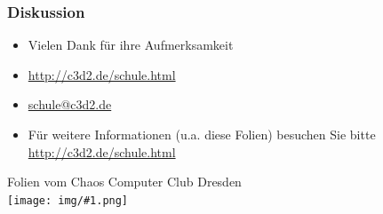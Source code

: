 \documentclass[table]{beamer}
\newcommand{\cc}[1]{\texttt{[image: img/\#1.png]}}
\begin{document}
\begin{frame}
    \frametitle{Diskussion}
    \begin{itemize}
        \item Vielen Dank für ihre Aufmerksamkeit
        \item \url{http://c3d2.de/schule.html}
        \item \url{schule@c3d2.de}
        \item Für weitere Informationen (u.a. diese Folien) besuchen Sie bitte \url{http://c3d2.de/schule.html}
    \end{itemize}
    \begin{center}
   Folien vom Chaos Computer Club Dresden\\
   {\cc{by-sa}}
   \end{center}
\end{frame}
\end{document}

